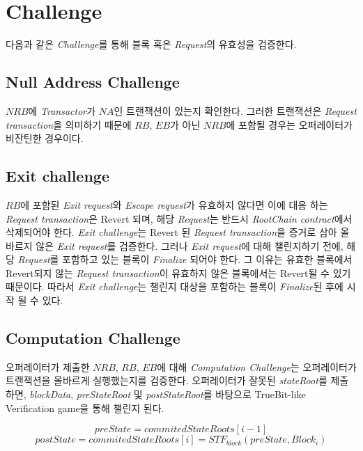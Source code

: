 \documentclass[letterpaper, 11pt]{article}
\begin{document}
\section{Challenge}
\begin{CJK}{UTF8}{mj}
다음과 같은 \emph{Challenge}를 통해 블록 혹은 \emph{Request}의 유효성을 검증한다.

\subsection{Null Address Challenge}
\begin{CJK}{UTF8}{mj}
$NRB$에 \emph{Transactor}가 $NA$인 트랜잭션이 있는지 확인한다. 그러한 트랜잭션은 \emph{Request transaction}을 의미하기 때문에 $RB$, $EB$가 아닌 $NRB$에 포함될 경우는 오퍼레이터가 비잔틴한 경우이다.
\end{CJK}

\subsection{Exit challenge}
\begin{CJK}{UTF8}{mj}
$RB$에 포함된 \emph{Exit request}와 \emph{Escape request}가 유효하지 않다면 이에 대응 하는 \emph{Request transaction}은 Revert 되며, 해당 \emph{Request}는 반드시 \emph{RootChain contract}에서 삭제되어야 한다. \emph{Exit challenge}는 Revert 된 \emph{Request transaction}을 증거로 삼아 올바르지 않은 \emph{Exit request}를 검증한다. 그러나 \emph{Exit request}에 대해 챌린지하기 전에, 해당 \emph{Request}를 포함하고 있는 블록이 \emph{Finalize} 되어야 한다. 그 이유는 유효한 블록에서 Revert되지 않는 \emph{Request transaction}이 유효하지 않은 블록에서는 Revert될 수 있기 때문이다. 따라서 \emph{Exit challenge}는 챌린지 대상을 포함하는 블록이 \emph{Finalize}된 후에 시작 될 수 있다.
\end{CJK}

\subsection{Computation Challenge}
\begin{CJK}{UTF8}{mj}
오퍼레이터가 제출한 $NRB$, $RB$, $EB$에 대해 \emph{Computation Challenge}는 오퍼레이터가 트랜잭션을 올바르게 실행했는지를 검증한다. 오퍼레이터가 잘못된 \emph{stateRoot}를 제출하면, \emph{blockData}, \emph{preStateRoot} 및 \emph{postStateRoot}를 바탕으로 TrueBit-like Verification game을 통해 챌린지 된다.

$$preState = commitedStateRoots[i-1]$$
$$postState = commitedStateRoots[i] = STF_{block}(preState, Block_i)$$


\end{CJK}
\end{CJK}
\end{document}
